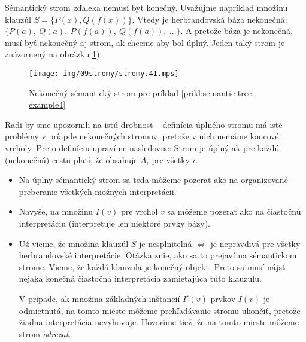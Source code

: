 \begin{priklad}
    \label{prikl:semantic-tree-example4}
    Sémantický strom zďaleka nemusí byť konečný. Uvažujme napríklad množinu
    klauzúl $S=\{P(x), Q(f(x)) \}$.
    Vtedy je herbrandovská báza nekonečná: 
    $\{ P(a),\ Q(a),\ P(f(a)),\ Q(f(a)),\ \ldots \}$.
    A pretože báza je nekonečná, musí byť nekonečný aj strom, ak chceme aby
    bol úplný. Jeden taký strom je znázornený na obrázku
    \ref{fig:semantic-tree-example4}):

    \begin{figure}[h]
        \centering
        \texttt{[image: img/09stromy/stromy.41.mps]}
        \caption{Nekonečný sémantický strom pre príklad
                \ref{prikl:semantic-tree-example4}}
        \label{fig:semantic-tree-example4}
    \end{figure}
\end{priklad}

\begin{poznamka}
    Radi by sme upozornili na istú drobnosť -- definícia úplného stromu má
    isté problémy v príapde nekonečných stromov, pretože v nich nemáme
    koncové vrcholy. Preto definíciu upravíme nasledovne:
    Strom je úplný ak pre každú (nekonečnú) cestu platí, že obsahuje $A_i$
    pre všetky $i$.
\end{poznamka}

\begin{poznamka}
    \noindent
    \begin{itemize}
    \item Na úplny sémantický strom sa teda môžeme pozerať ako na organizované
        preberanie všetkých možných interpretácii.
    \item Navyše, na množinu $I(v)$ pre vrchol $v$ sa môžeme pozerať ako na
        čiastočnú interpretáciu (interpretuje len niektoré prvky bázy).
    \item Už vieme, že množina klauzúl $S$ je nesplniteľná $\iff$
        je nepravdivá pre všetky herbrandovské interpretácie. Otázka znie,
        ako sa to prejaví na sémantickom strome. Vieme, že každá klauzula
        je konečný objekt. Preto sa musí nájsť nejaká konečná čiastočná
        interpretácia zamietajúca túto klauzulu.

        V prípade, ak množina základných inštancií $I'(v)$ prvkov $I(v)$
        je odmietnutá, na tomto mieste môžeme prehľadávanie stromu ukončiť,
        pretože žiadna interpretácia nevyhovuje. Hovoríme tiež,
        že na tomto mieste môžeme strom \emph{odrezať}.
    \end{itemize}
\end{poznamka}

